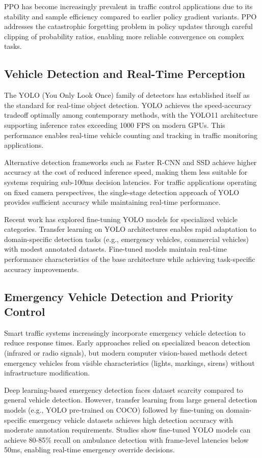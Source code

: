 \documentclass[10pt,conference]{IEEEtran}
\begin{document}
PPO has become increasingly prevalent in traffic control applications due to its stability and sample efficiency compared to earlier policy gradient variants. PPO addresses the catastrophic forgetting problem in policy updates through careful clipping of probability ratios, enabling more reliable convergence on complex tasks.

\subsection{Vehicle Detection and Real-Time Perception}

The YOLO (You Only Look Once) family of detectors has established itself as the standard for real-time object detection. YOLO achieves the speed-accuracy tradeoff optimally among contemporary methods, with the YOLO11 architecture supporting inference rates exceeding 1000 FPS on modern GPUs. This performance enables real-time vehicle counting and tracking in traffic monitoring applications.

Alternative detection frameworks such as Faster R-CNN and SSD achieve higher accuracy at the cost of reduced inference speed, making them less suitable for systems requiring sub-100ms decision latencies. For traffic applications operating on fixed camera perspectives, the single-stage detection approach of YOLO provides sufficient accuracy while maintaining real-time performance.

Recent work has explored fine-tuning YOLO models for specialized vehicle categories. Transfer learning on YOLO architectures enables rapid adaptation to domain-specific detection tasks (e.g., emergency vehicles, commercial vehicles) with modest annotated datasets. Fine-tuned models maintain real-time performance characteristics of the base architecture while achieving task-specific accuracy improvements.

\subsection{Emergency Vehicle Detection and Priority Control}

Smart traffic systems increasingly incorporate emergency vehicle detection to reduce response times. Early approaches relied on specialized beacon detection (infrared or radio signals), but modern computer vision-based methods detect emergency vehicles from visible characteristics (lights, markings, sirens) without infrastructure modification.

Deep learning-based emergency detection faces dataset scarcity compared to general vehicle detection. However, transfer learning from large general detection models (e.g., YOLO pre-trained on COCO) followed by fine-tuning on domain-specific emergency vehicle datasets achieves high detection accuracy with moderate annotation requirements. Studies show fine-tuned YOLO models can achieve 80-85\% recall on ambulance detection with frame-level latencies below 50ms, enabling real-time emergency override decisions.
\end{document}
